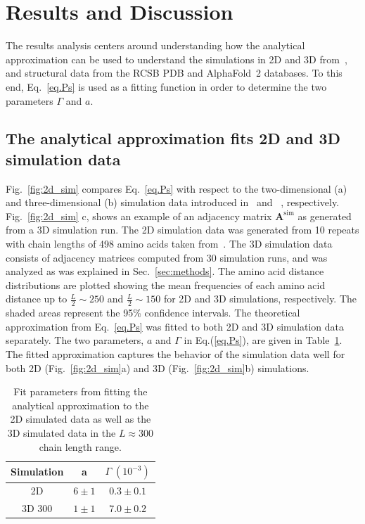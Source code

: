 \documentclass[
reprint,
twocolumn,
amsmath,amssymb,superscriptaddress,aps,
pre]{revtex4-1}
\begin{document}
\section{Results and Discussion}\label{sec:results}
The results analysis centers around understanding how the analytical approximation can be used to understand the simulations in 2D and 3D from~\cite{molkenthin2016scaling,molkenthin2020self}, and structural data from the RCSB PDB and AlphaFold~2 databases. To this end, Eq.~\ref{eq.Ps} is used as a fitting function in order to determine the two parameters $\Gamma$ and $a$.

\subsection{The analytical approximation fits 2D and 3D simulation data}
Fig.~\ref{fig:2d_sim} compares Eq.~\ref{eq.Ps} with respect to the two-dimensional (a) and three-dimensional (b) simulation data introduced in~\cite{molkenthin2016scaling} and ~\cite{molkenthin2020self}, respectively. Fig.~\ref{fig:2d_sim} c, shows an example of an adjacency matrix $\mathbf{A}^{\mathrm{sim}}$ as generated from a 3D simulation run. The 2D simulation data was generated from 10 repeats with chain lengths of 498 amino acids taken from~\cite{molkenthin2016scaling}. The 3D simulation data consists of adjacency matrices computed from 30 simulation runs, and was analyzed as was explained in Sec.~\ref{sec:methods}. The amino acid distance distributions are plotted showing the mean frequencies of each amino acid distance up to $\frac{L}{2}\sim250$ and $\frac{L}{2}\sim150$ for 2D and 3D simulations, respectively. The shaded areas represent the 95\% confidence intervals. The theoretical approximation from Eq.~\ref{eq.Ps} was fitted to both 2D and 3D simulation data separately. The two parameters, $a$ and $\Gamma$ in Eq.(\ref{eq.Ps}), are given in Table~\ref{table:sim-results}. The fitted approximation captures the behavior of the simulation data well for both 2D (Fig.~\ref{fig:2d_sim}a) and 3D (Fig.~\ref{fig:2d_sim}b) simulations.

\begin{table}[htb]
\centering
\setlength{\tabcolsep}{25pt}
\begin{tabular}{ccc}
\hline
Simulation & a &$\Gamma\; (10^{-3})$ \\
\hline
2D& $6 \pm 1$ & $0.3 \pm 0.1$ \\
3D 300& $1 \pm 1$ & $7.0 \pm 0.2$ \\
\hline
\end{tabular}%
\caption{Fit parameters from fitting the analytical approximation to the 2D simulated data as well as the 3D simulated data in the $L\approx 300$ chain length range.}
\label{table:sim-results}
\end{table}
\end{document}
